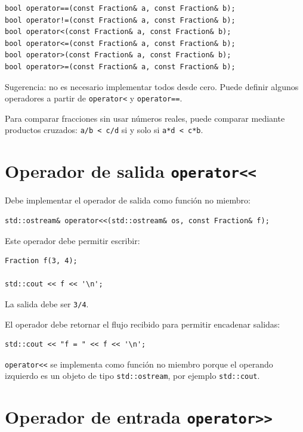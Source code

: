 \documentclass[11pt,a4paper]{article}
\begin{document}
\begin{lstlisting}
bool operator==(const Fraction& a, const Fraction& b);
bool operator!=(const Fraction& a, const Fraction& b);
bool operator<(const Fraction& a, const Fraction& b);
bool operator<=(const Fraction& a, const Fraction& b);
bool operator>(const Fraction& a, const Fraction& b);
bool operator>=(const Fraction& a, const Fraction& b);
\end{lstlisting}

Sugerencia: no es necesario implementar todos desde cero. Puede definir algunos operadores a partir de \lstinline|operator<| y \lstinline|operator==|.

Para comparar fracciones sin usar números reales, puede comparar mediante productos cruzados: \lstinline|a/b < c/d| si y solo si \lstinline|a*d < c*b|.

\section{Operador de salida \texorpdfstring{\texttt{operator\textless\textless}}{operator<<}}

Debe implementar el operador de salida como función no miembro:

\begin{lstlisting}
std::ostream& operator<<(std::ostream& os, const Fraction& f);
\end{lstlisting}

Este operador debe permitir escribir:

\begin{lstlisting}
Fraction f(3, 4);

std::cout << f << '\n';
\end{lstlisting}

La salida debe ser \lstinline|3/4|.

El operador debe retornar el flujo recibido para permitir encadenar salidas:

\begin{lstlisting}
std::cout << "f = " << f << '\n';
\end{lstlisting}

\lstinline|operator<<| se implementa como función no miembro porque el operando izquierdo es un objeto de tipo \lstinline|std::ostream|, por ejemplo \lstinline|std::cout|.

\section{Operador de entrada \texorpdfstring{\texttt{operator\textgreater\textgreater}}{operator>>}}
\end{document}

